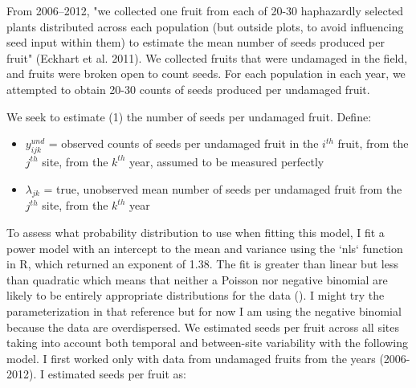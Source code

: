 \documentclass[12pt, oneside, titlepage]{article}   	%
\begin{document}
From 2006--2012, "we collected one fruit from each of 20-30 haphazardly selected plants distributed across each population (but outside plots, to avoid influencing seed input within them) to estimate the mean number of seeds produced per fruit" (Eckhart et al. 2011). We collected fruits that were undamaged in the field, and fruits were broken open to count seeds. For each population in each year, we attempted to obtain 20-30 counts of seeds produced per undamaged fruit. 


We seek to estimate (1) the number of seeds per undamaged fruit. Define:


\begin{itemize}
	\item $y^{und}_{ijk}$ = observed counts of seeds per undamaged fruit in the $i^{th}$ fruit, from the $j^{th}$ site, from the $k^{th}$ year, assumed to be measured perfectly
	\item $\lambda_{jk}$ = true, unobserved mean number of seeds per undamaged fruit from the $j^{th}$ site, from the $k^{th}$ year
\end{itemize}

To assess what probability distribution to use when fitting this model, I fit a power model with an intercept to the mean and variance using the `nls` function in R, which returned an exponent of 1.38. The fit is greater than linear but less than quadratic which means that neither a Poisson nor negative binomial are likely to be entirely appropriate distributions for the data (\cite{linden2011}). I might try the parameterization in that reference but for now I am using the negative binomial because the data are overdispersed. We estimated seeds per fruit across all sites taking into account both temporal and between-site variability with the following model. I first worked only with data from undamaged fruits from the years (2006-2012). I estimated seeds per fruit as: 
\end{document}
